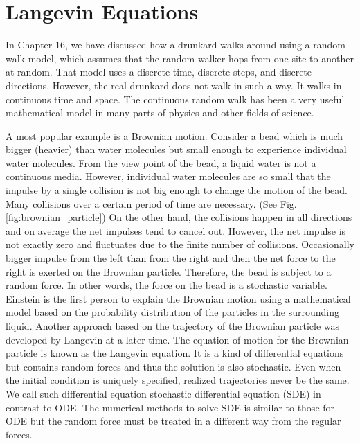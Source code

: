 \chapter{Langevin Equations}\label{ch:langevin}

In Chapter 16, we have discussed how a drunkard walks around using a random walk model, which assumes that the random walker hops from one site to another at random.  That model uses a discrete time, discrete steps, and discrete directions.  However, the real drunkard does not walk in such a way.  It walks in continuous time and space.  The continuous random walk has been a very useful mathematical model in many parts of physics and other fields of science. 

A most popular example is a Brownian motion.
Consider a bead which is much bigger (heavier) than water molecules but small enough to experience individual water molecules.  From the view point of the bead, a liquid water is not a continuous media.  However, individual water molecules are so small that the impulse by a single collision is not big enough to change the motion of the bead.  Many collisions over a certain period of time are necessary. (See Fig. \ref{fig:brownian_particle})  On the other hand, the collisions happen in all directions and on average the net impulses tend to cancel out.  However, the net impulse is not exactly zero and fluctuates due to the finite number of collisions.  Occasionally bigger impulse from the left than from the right and then the net force to the right is exerted on the Brownian particle. Therefore, the bead is subject to a random force. In other words, the force on the bead is a stochastic variable. Einstein is the first person to explain the Brownian motion using a mathematical model based on the probability distribution of the particles in the surrounding liquid.\cite{brownian_movement_einstein}  Another approach based on the trajectory of the Brownian particle was developed by Langevin at a later time.\cite{langevin_eq_lemons}  The equation of motion for the Brownian particle is known as the Langevin equation.\cite{langevin_eq_zwanzig,langevin_eq_sekimoto}  It is a kind of differential equations but contains random forces and thus the solution is also stochastic.  Even when the initial condition is uniquely specified, realized trajectories never be the same. We call such differential equation stochastic differential equation (SDE) in contrast to ODE.  The numerical methods to solve SDE is similar to those for ODE but the random force must be treated in a different way from the regular forces.


